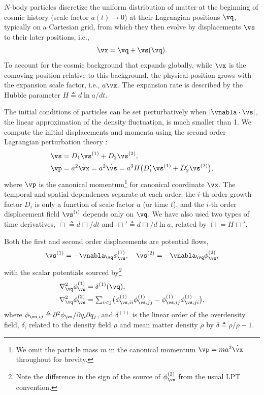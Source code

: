 \documentclass[modern, trackchanges, dvipsnames]{aastex631}
\renewcommand{\d}{d}
\newcommand{\p}{\partial}
\begin{document}
$N$-body particles discretize the uniform distribution of matter at the
beginning of cosmic history (scale factor $a(t) \to 0$) at their
Lagrangian positions $\vq$, typically on a Cartesian grid, from which
they then evolve by displacements $\vs$ to their later positions, i.e.,
%
\begin{equation}
\vx = \vq + \vs(\vq).
\end{equation}
%
To account for the cosmic background that expands globally, while $\vx$
is the comoving position relative to this background, the physical
position grows with the expansion scale factor, i.e., $a \vx$.
The expansion rate is described by the Hubble parameter $H \triangleq \d
\ln a / \d t$.

The initial conditions of particles can be set perturbatively when
$|\vnabla \cdot \vs|$, the linear approximation of the density
fluctuation, is much smaller than 1.
We compute the initial displacements and momenta using the second order
Lagrangian perturbation theory \citep[2LPT,][]{BouchetEtAl1995}:
%
\begin{align}
\vs &= D_1 \vs^{(1)} + D_2 \vs^{(2)}, \nonumber\\
\vp &= a^2 \dot\vx = a^2 \dot\vs
  = a^3 H \bigl( D_1' \vs^{(1)} + D_2' \vs^{(2)} \bigr),
\label{ic}
\end{align}
%
where $\vp$ is the canonical momentum\footnote{We omit the particle mass
$m$ in the canonical momentum $\vp = m a^2 \dot\vx$ throughout for
brevity.} for canonical coordinate $\vx$.
The temporal and spatial dependences separate at each order: the $i$-th
order growth factor $D_i$ is only a function of scale factor $a$ (or
time $t$), and the $i$-th order displacement field $\vs^{(i)}$ depends
only on $\vq$.
We have also used two types of time derivatives, $\dot\Box \triangleq
\d\Box / \d t$ and $\Box' \triangleq \d\Box / \d \ln a$, related by
$\dot\Box = H \Box'$.

Both the first and second order displacements are potential flows,
%
\begin{equation}
\vs^{(1)} = - \vnabla_\vq \phi_\vs^{(1)},
\quad
\vs^{(2)} = - \vnabla_\vq \phi_\vs^{(2)},
\end{equation}
%
with the scalar potentials sourced by\footnote{Note the difference in
the sign of the source of $\phi_\vs^{(2)}$ from the usual LPT
convention.}
%
\begin{align}
\nabla_\vq^2 \phi_\vs^{(1)} &= \delta^{(1)}(\vq), \nonumber\\
%
\nabla_\vq^2 \phi_\vs^{(2)} &= {\textstyle \sum_{i<j}} \bigl(
  \phi_{\vs,ii}^{(1)}\phi_{\vs,jj}^{(1)}
  - \phi_{\vs,ij}^{(1)}\phi_{\vs,ji}^{(1)}
\bigr),
\end{align}
%
where $\phi_{\vs,ij} \triangleq \p^2\phi_\vs / \p q_i \p q_j$,
and $\delta^{(1)}$ is the linear order of the overdensity field,
$\delta$, related to the density field $\rho$ and mean matter density
$\bar\rho$ by $\delta \triangleq \rho / \bar\rho - 1$.
\end{document}
